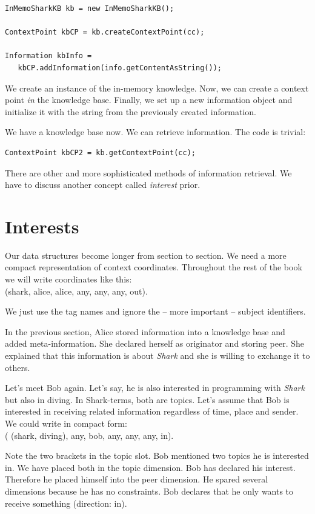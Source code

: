 \begin{verbatim}
InMemoSharkKB kb = new InMemoSharkKB();

ContextPoint kbCP = kb.createContextPoint(cc);

Information kbInfo =
   kbCP.addInformation(info.getContentAsString());
\end{verbatim}

We create an instance of the in-memory knowledge. Now, we can create a context point {\it in} the knowledge base. Finally, we set up a new information object and initialize it with the string from the previously created information.

We have a knowledge base now. We can retrieve information. The code is trivial:

\begin{verbatim}
ContextPoint kbCP2 = kb.getContextPoint(cc);
\end{verbatim}

There are other and more sophisticated methods of information retrieval. We have to discuss another concept called {\it interest} prior.

\section{Interests}
Our data structures become longer from section to section. We need a more compact representation of context coordinates. Throughout the rest of the book we will write coordinates like this:\\
(shark, alice, alice, any, any, any, out).

We just use the tag names and ignore the -- more important -- subject identifiers.

In the previous section, Alice stored information into a knowledge base and added meta-information. She declared herself as originator and storing peer. She explained that this information is about {\it Shark} and she is willing to exchange it to others.

Let's meet Bob again. Let's say, he is also interested in programming with {\it Shark} but also in diving. In Shark-terms, both are topics. Let's assume that Bob is interested in receiving related information regardless of time, place and sender. We could write in compact form:\\
( (shark, diving), any, bob, any, any, any, in).

Note the two brackets in the topic slot. Bob mentioned two topics he is interested in. We have placed both in the topic dimension. Bob has declared his interest. Therefore he placed himself into the peer dimension. He spared several dimensions because he has no constraints. Bob declares that he only wants to receive something (direction: in).

